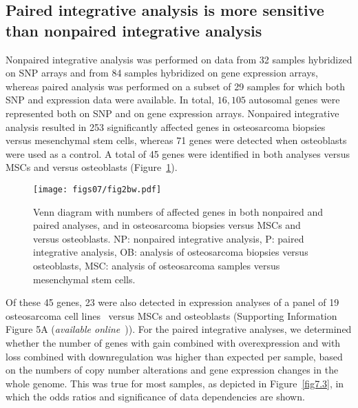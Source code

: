 \subsection{Paired integrative analysis is more sensitive than nonpaired integrative analysis}
Nonpaired integrative analysis was performed
on data from 32 samples hybridized on SNP
arrays and from 84 samples hybridized on gene
expression arrays, whereas paired analysis was
performed on a subset of 29 samples for which
both SNP and expression data were available. In
total, $16,105$ autosomal genes were represented
both on SNP and on gene expression arrays.
Nonpaired integrative analysis resulted in 253
significantly affected genes in osteosarcoma biopsies
versus mesenchymal stem cells, whereas 71
genes were detected when osteoblasts were used
as a control. A total of 45 genes were identified
in both analyses versus MSCs and versus osteoblasts
(Figure~\ref{fig7.2}).
%
\begin{figure}[htbp]
  \centering
  \begin{minipage}[b]{0.50\linewidth}
    \texttt{[image: figs07/fig2bw.pdf]}		%
  \end{minipage}
    \hfill
  \begin{minipage}[b]{0.46\linewidth}
    \caption{Venn diagram with numbers of affected genes in both nonpaired and paired analyses, and in osteosarcoma biopsies versus MSCs and versus osteoblasts. NP: nonpaired integrative analysis, P: paired integrative analysis, OB: analysis of osteosarcoma biopsies versus osteoblasts, MSC: analysis of osteosarcoma samples versus mesenchymal stem cells.}
     \label{fig7.2}
     \end{minipage}
\end{figure}
%
Of these 45 genes, 23 were also
detected in expression analyses of a panel of 19
osteosarcoma cell lines~\cite{ottaviano2010molecular}
versus MSCs and osteoblasts (Supporting Information
Figure 5A ({\it available online}~\cite{ch7additional})). For the paired integrative analyses,
we determined whether the number of genes
with gain combined with overexpression and with
loss combined with downregulation was higher
than expected per sample, based on the numbers
of copy number alterations and gene expression
changes in the whole genome. This was true for
most samples, as depicted in Figure~\ref{fig7.3}, in which the
odds ratios and significance of data dependencies
are shown.
%
